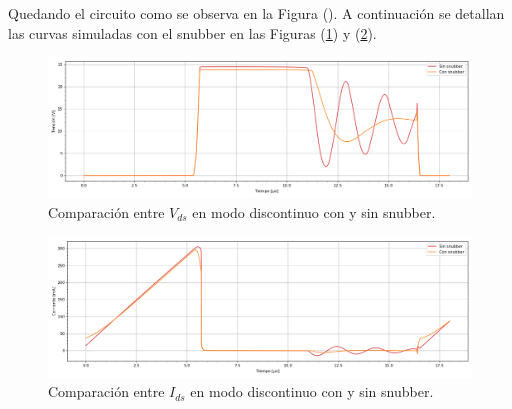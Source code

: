 Quedando el circuito como se observa en la Figura (). A continuación se detallan las curvas simuladas con el snubber en las Figuras (\ref{ej4:fig:vds_snub}) y (\ref{ej4:fig:il_snub}).


\begin{figure}[H]
	\centering
	\includegraphics[width=0.9\linewidth]{ImagenesEjercicio-4/comparacion-vds}
	\caption{Comparación entre $V_{ds}$ en modo discontinuo con y sin snubber.}
	\label{ej4:fig:vds_snub}
\end{figure}

\begin{figure}[H]
	\centering
	\includegraphics[width=0.9\linewidth]{ImagenesEjercicio-4/comparacion-ids}
	\caption{Comparación entre $I_{ds}$ en modo discontinuo con y sin snubber.}
	\label{ej4:fig:il_snub}
\end{figure}

